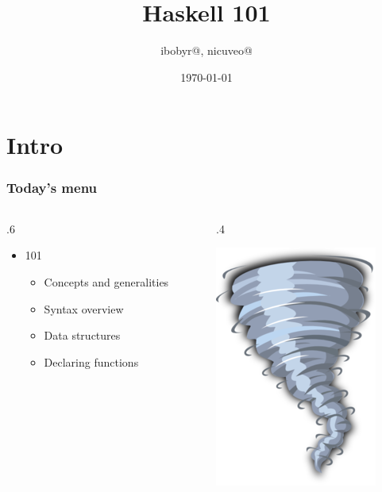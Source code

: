 \documentclass[17pt]{beamer}
\title{Haskell 101}
\author{ibobyr@, nicuveo@}
\date{\small\today}
\renewcommand{\(}[1]{\begin{columns}[#1]}
\renewcommand{\)}{\end{columns}}
\newcommand{\<}[1]{\begin{column}{#1}}
\renewcommand{\>}{\end{column}}
\begin{document}

\togglefalse{showpagenumber}
\begin{frame}[fragile]
  \titlepage
\end{frame}
\toggletrue{showpagenumber}
\setcounter{framenumber}{0}


\section{Intro}

\begin{frame}
  \frametitle{Today's menu}
  \({c}
  \<{.6\textwidth}
  \begin{center}
  \begin{itemize}
  \item 101
    \begin{itemize}
    \item Concepts and generalities
    \item Syntax overview
    \item Data structures
    \item Declaring functions
    \end{itemize}
  \end{itemize}
  \end{center}
  \>
  \<{.4\textwidth}
  \begin{center}
    \includegraphics[width=.5\textwidth]{img/whirlwind}
  \end{center}
  \>
  \)
\end{frame}
\end{document}

